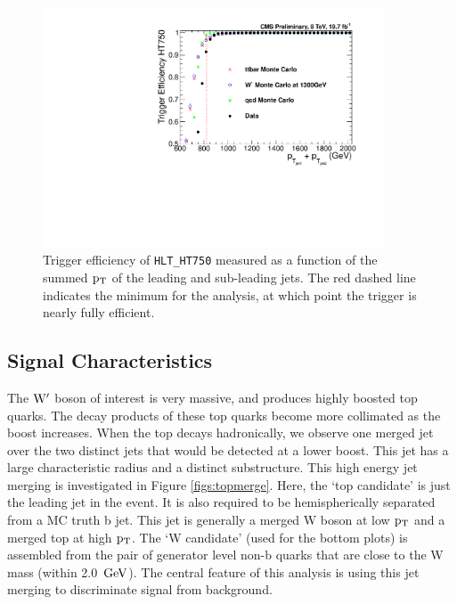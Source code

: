 \begin{figure}[htcb]
\centering
\includegraphics[width=0.9\textwidth]{AN-13-004/figs/Trigger_Comparison_Htdijet.pdf}
\caption{Trigger efficiency of \texttt{HLT\_HT750} measured as a function of the summed $\mathrm{p_{T}}$ of the leading and sub-leading jets.  The red dashed line indicates the minimum for the analysis, 
at which point the trigger is nearly fully efficient.}
\label{figs:Trigger_Comparison_Ht}
\end{figure}

\subsection{Signal Characteristics}
\label{sec:sigchar}
\label{sec:GenBptCut}
The $\mathrm{W}^\prime$ boson of interest is very massive, and produces highly boosted top quarks.  The decay products of these top quarks become more collimated as the boost 
increases.  When the top decays hadronically, we observe one merged jet over the two distinct jets that would be detected at a lower boost.  This jet has a 
large characteristic radius and a distinct substructure.  This high energy jet merging is investigated in Figure \ref{figs:topmerge}.  Here, the `top candidate' 
is just the leading jet in the event.  It is also required to be hemispherically separated from a MC truth b jet.  This jet is generally a merged W boson at low $\mathrm{p_{T}}$ and a merged top at high $\mathrm{p_{T}}$.
The `W candidate' (used for the bottom plots) is assembled from the pair of generator level non-b quarks that are close to the W mass (within 2.0~$\mathrm{GeV}$).  
The central feature of this analysis is using this jet merging to discriminate signal from background.

